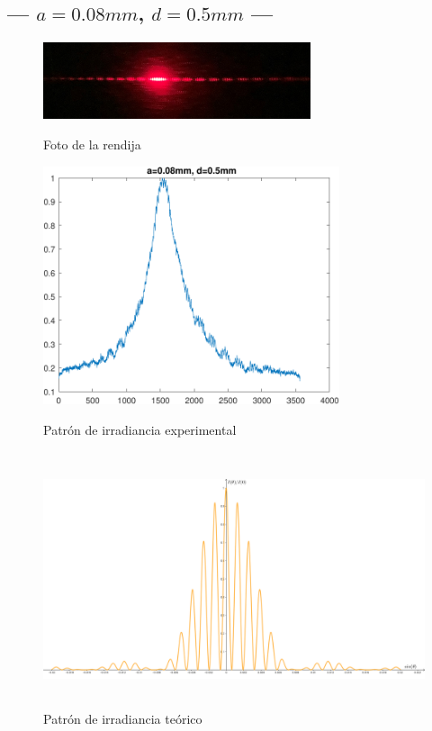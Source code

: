 \documentclass[12pt,a4paper]{article}
\begin{document}
	\newpage
	\subsection{--- \(a=0.08mm\), \(d=0.5mm\) ---} %
	\label{sub:a_alto_d_alto}
	\begin{figure}[htbp!]
		\centering
		\includegraphics[width=0.7\textwidth]{3_RESUL/08_y_5.jpg}
		\caption{Foto de la rendija}
		\label{fig:A10}
		\includegraphics[width=0.7\linewidth,height=7cm]{3_RESUL/08_y_5.pdf}
		\caption{Patrón de irradiancia experimental}
		\label{fig:A11}
		\includegraphics[width=0.7\linewidth,height=7.5cm]{3_RESUL/Irradiancia 4.png}
		\caption{Patrón de irradiancia teórico}
		\label{fig:A12}
	\end{figure}
\end{document}
